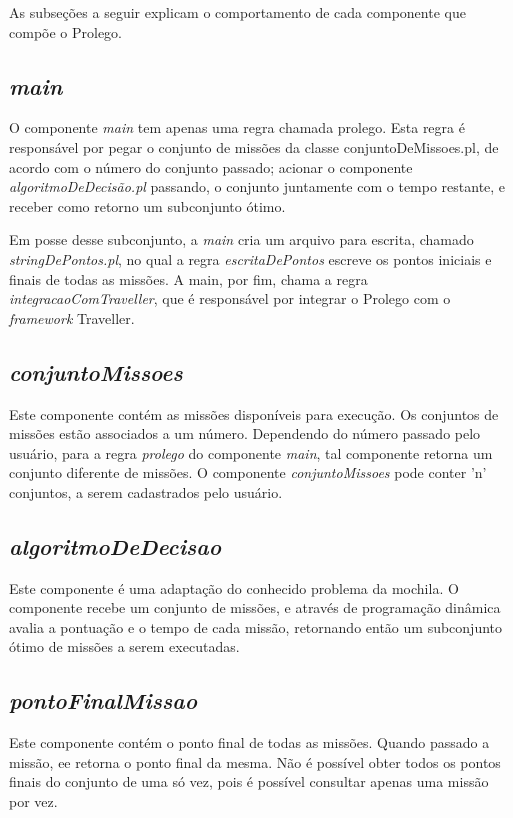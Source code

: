  
 As subseções a seguir explicam o comportamento de cada componente que compõe o Prolego.


\subsection{\textit{main}}
	O componente \textit{main} tem apenas uma regra chamada prolego. Esta regra é responsável por pegar o conjunto de missões da classe conjuntoDeMissoes.pl, de acordo com o número do conjunto passado; acionar o componente \textit{algoritmoDeDecisão.pl} passando, o conjunto juntamente com o tempo restante, e receber como retorno um subconjunto ótimo.
	
	Em posse desse subconjunto, a \textit{main} cria um arquivo para escrita, chamado \textit{stringDePontos.pl}, no qual a regra \textit{escritaDePontos} escreve os pontos iniciais e finais de todas as missões.
	A main, por fim, chama a regra \textit{integracaoComTraveller}, que é responsável por integrar o Prolego com o \textit{framework} Traveller.

\subsection{\textit{conjuntoMissoes}}
	Este componente contém as missões disponíveis para execução. Os conjuntos de missões estão associados a um número. Dependendo do número passado pelo usuário, para a regra \textit{prolego} do componente \textit{main}, tal componente retorna um conjunto diferente de missões. O componente \textit{conjuntoMissoes} pode conter 'n' conjuntos, a serem cadastrados pelo usuário.
	
\subsection{\textit{algoritmoDeDecisao}}
	Este componente é uma adaptação do conhecido problema da mochila. O componente recebe um conjunto de missões, e através de programação dinâmica avalia a pontuação e o tempo de cada missão, retornando então um subconjunto ótimo de missões a serem executadas.

\subsection{\textit{pontoFinalMissao}}
	Este componente contém o ponto final de todas as missões. Quando passado a missão, ee retorna o ponto final da mesma. Não é possível obter todos os pontos finais do conjunto de uma só vez, pois é possível consultar apenas uma missão por vez.
	
